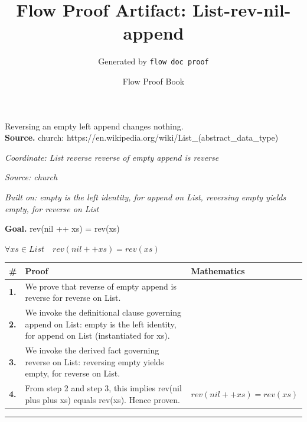 \documentclass[11pt]{article}
\title{Flow Proof Artifact: List-rev-nil-append}
\author{Generated by \texttt{flow doc proof}}
\date{Flow Proof Book}
\theoremstyle{definition}
\begin{document}
\maketitle
Reversing an empty left append changes nothing.\\[0.5em]
\textbf{Source.} church: https://en.wikipedia.org/wiki/List\_(abstract\_data\_type)\\[0.5em]
\bigskip
{}\par
\smallskip\noindent\textit{Coordinate: List \cdot reverse \cdot reverse of empty append is reverse}\par
\smallskip\noindent\textit{Source: church}\par
\smallskip\noindent\textit{Built on: empty is the left identity, for append on List, reversing empty yields empty, for reverse on List}\par
\medskip
\noindent\textbf{Goal.} rev(nil ++ xs) = rev(xs)\par
\noindent$\displaystyle \forall xs \in List\quad rev(nil ++ xs) = rev(xs)$\par
\medskip
\noindent
\begin{tabular}{@{} >{\raggedright\arraybackslash}p{} >{\raggedright\arraybackslash}p{} >{\raggedleft\arraybackslash}p{} @{}}
\textbf{\#} & \textbf{Proof} & \textbf{Mathematics} \\
\midrule
\textbf{1.} & We prove that reverse of empty append is reverse for reverse on List. & \\[0.45em]
\textbf{2.} & We invoke the definitional clause governing append on List: empty is the left identity, for append on List (instantiated for xs). & \\[0.45em]
\textbf{3.} & We invoke the derived fact governing reverse on List: reversing empty yields empty, for reverse on List. & \\[0.45em]
\textbf{4.} & From step 2 and step 3, this implies rev(nil plus plus xs) equals rev(xs). Hence proven. & $\displaystyle rev(nil ++ xs) = rev(xs)$ \\[0.45em]
\bottomrule
\end{tabular}
\label{thm:List-reverse-reverse_of_empty_append_is_reverse}
\par\medskip\hrule
\end{document}
